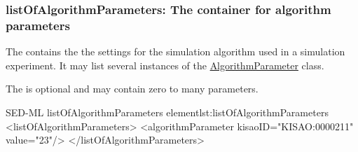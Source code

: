 
\subsubsection{listOfAlgorithmParameters: The container for algorithm parameters}
\label{sec:listOfAlgorithmParameters}

The  contains the the settings for the simulation algorithm used in a simulation experiment. It may list several instances of the \hyperref[class:algorithmParameter]{AlgorithmParameter} class.

%
The  is optional and may contain zero to many parameters. 
%
\begin{myXmlLst}{SED-ML listOfAlgorithmParameters element}{lst:listOfAlgorithmParameters}
<listOfAlgorithmParameters>
  <algorithmParameter kisaoID="KISAO:0000211" value="23"/> 
</listOfAlgorithmParameters>
\end{myXmlLst}
%

